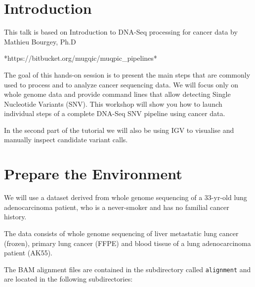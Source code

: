 \newpage


\section{Introduction}

This talk is based on Introduction to DNA-Seq processing for cancer data by Mathieu Bourgey, Ph.D  

*https://bitbucket.org/mugqic/muqpic\_pipelines*

The goal of this hands-on session is to present the main steps that are commonly used to process and to analyze cancer sequencing data. We will focus only on whole genome data and provide command lines that allow detecting Single Nucleotide Variants (SNV). This workshop will show you how to launch individual steps of a complete DNA-Seq SNV pipeline using cancer data.

In the second part of the tutorial we will also be using IGV to visualise and manually inspect candidate variant calls.


\section{Prepare the Environment}

We will use a dataset derived from whole genome sequencing of a 33-yr-old lung adenocarcinoma patient, who is a never-smoker and has no familial cancer history.

The data consists of whole genome sequencing of liver metastatic lung cancer (frozen), primary lung cancer (FFPE) and blood tissue of a lung adenocarcinoma patient (AK55).

The BAM alignment files are contained in the subdirectory called \texttt{alignment} and are located in the following subdirectories:

\begin{description}[style=multiline,labelindent=1.5cm,align=left,leftmargin=2.5cm]
  \item[\texttt{normal/normal.sorted.bam} and \texttt{normal/normal.sorted.bam.bai}] \hfill\\
  \item[\texttt{tumor/tumor.sorted.bam} and \texttt{tumor/tumor.sorted.bam.bai}] \hfill\\ 
\end{description}

